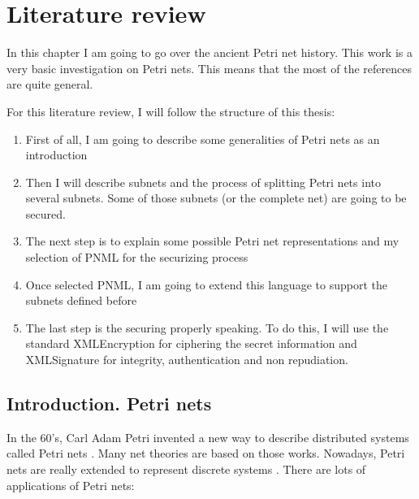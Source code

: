 
\chapter{Literature review} %

\label{Chapter: LiteratureReview} %



In this chapter I am going to go over the ancient Petri net history. 
This work is a very basic investigation 
on Petri nets. This means that the most of the references are quite general.

For this literature review, I will follow the structure of this thesis:

\begin{enumerate}
\item First of all, I am going to describe some generalities of Petri nets
as an introduction
\item Then I will describe subnets and the process of splitting Petri nets
into several subnets. Some of those subnets (or the complete net) are going to be secured. 
\item The next step is to explain some possible Petri net representations
and my selection of PNML for the securizing process
\item Once selected PNML, I am going to extend this language to support the
subnets defined before
\item The last step is the securing properly speaking. To do this, I will use the standard XMLEncryption for ciphering the secret information and XMLSignature
for integrity, authentication and non repudiation. \end{enumerate}

\section{Introduction. Petri nets}

In the 60's, Carl Adam Petri invented a new way to describe distributed systems
called Petri nets \citep{G-Petri1962PhD,G-Petri1966,G-Petri1976}. Many net
theories
are based on those works\cite{G-Petri2007}. Nowadays,
Petri nets are really extended to represent discrete systems \cite{G-EPN-Jimenez20044897,SM-Holloway1997151,EPN-SM-Latorre2010152,EPN-SM-Latorre2010247,EPN-SM-Silva2011427}. There are lots of applications
of Petri nets:

